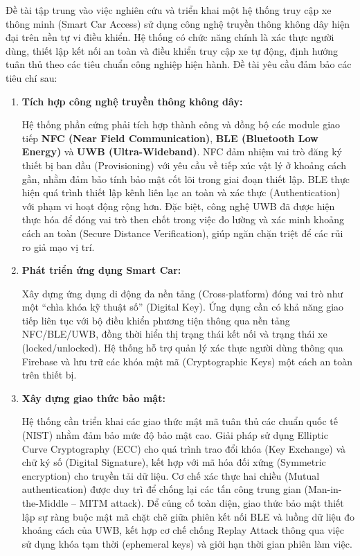 Đề tài tập trung vào việc nghiên cứu và triển khai một hệ thống truy cập xe thông minh (Smart Car Access) sử dụng công nghệ truyền thông không dây hiện đại trên nền tự vi điều khiển. Hệ thống có chức năng chính là xác thực người dùng, thiết lập kết nối an toàn và điều khiển truy cập xe tự động, định hướng tuân thủ theo các tiêu chuẩn công nghiệp hiện hành. Đề tài yêu cầu đảm bảo các tiêu chí sau:

\begin{enumerate}
    \item \textbf{Tích hợp công nghệ truyền thông không dây:}
    
    Hệ thống phần cứng phải tích hợp thành công và đồng bộ các module giao tiếp \textbf{NFC (Near Field Communication)}, \textbf{BLE (Bluetooth Low Energy)} và \textbf{UWB (Ultra-Wideband)}. NFC đảm nhiệm vai trò đăng ký thiết bị ban đầu (Provisioning) với yêu cầu về tiếp xúc vật lý ở khoảng cách gần, nhằm đảm bảo tính bảo mật cốt lõi trong giai đoạn thiết lập. BLE thực hiện quá trình thiết lập kênh liên lạc an toàn và xác thực (Authentication) với phạm vi hoạt động rộng hơn. Đặc biệt, công nghệ UWB đã được hiện thực hóa để đóng vai trò then chốt trong việc đo lường và xác minh khoảng cách an toàn (Secure Distance Verification), giúp ngăn chặn triệt để các rủi ro giả mạo vị trí.

    \item \textbf{Phát triển ứng dụng Smart Car:}
    
    Xây dựng ứng dụng di động đa nền tảng (Cross-platform) đóng vai trò như một ``chìa khóa kỹ thuật số'' (Digital Key). Ứng dụng cần có khả năng giao tiếp liên tục với bộ điều khiển phương tiện thông qua nền tảng NFC/BLE/UWB, đồng thời hiển thị trạng thái kết nối và trạng thái xe (locked/unlocked). Hệ thống hỗ trợ quản lý xác thực người dùng thông qua Firebase và lưu trữ các khóa mật mã (Cryptographic Keys) một cách an toàn trên thiết bị.

    \item \textbf{Xây dựng giao thức bảo mật:}
    
    Hệ thống cần triển khai các giao thức mật mã tuân thủ các chuẩn quốc tế (NIST) \cite{nist_ecdh, fips186} nhằm đảm bảo mức độ bảo mật cao. Giải pháp sử dụng Elliptic Curve Cryptography (ECC) cho quá trình trao đổi khóa (Key Exchange) và chữ ký số (Digital Signature), kết hợp với mã hóa đối xứng (Symmetric encryption) cho truyền tải dữ liệu. Cơ chế xác thực hai chiều (Mutual authentication) được duy trì để chống lại các tấn công trung gian (Man-in-the-Middle -- MITM attack). Để củng cố toàn diện, giao thức bảo mật thiết lập sự ràng buộc mật mã chặt chẽ giữa phiên kết nối BLE và luồng dữ liệu đo khoảng cách của UWB, kết hợp cơ chế chống Replay Attack thông qua việc sử dụng khóa tạm thời (ephemeral keys) và giới hạn thời gian phiên làm việc.


\end{enumerate}
